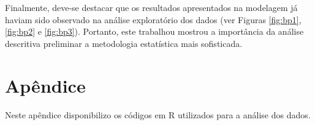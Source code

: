 \documentclass[12pt,a4paper,final]{article}
\begin{document}
Finalmente, deve-se destacar que os resultados apresentados na modelagem já haviam sido observado na análise 
exploratório dos dados (ver Figuras \ref{fig:bp1}, \ref{fig:bp2} e \ref{fig:bp3}). Portanto, este trabalhou
mostrou a importância da análise descritiva preliminar a metodologia estatística mais sofisticada.




\newpage


\newpage
\section*{Apêndice}
Neste apêndice disponibilizo os códigos em \textsf{R} utilizados para a análise dos dados.
\end{document}
